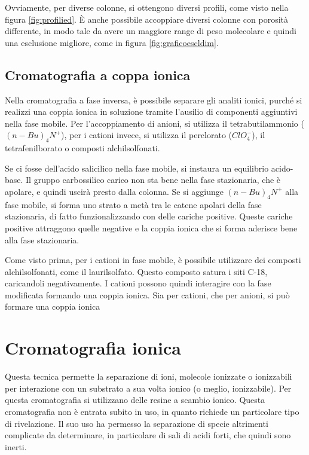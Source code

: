 
Ovviamente, per diverse colonne, si ottengono diversi profili, come visto nella figura \ref{fig:profilied}. È anche possibile accoppiare diversi colonne con porosità differente, in modo tale da avere un maggiore range di peso molecolare e quindi una esclusione migliore, come in figura \ref{fig:graficoescldim}.


\subsection{Cromatografia a coppa ionica}
Nella cromatografia a fase inversa, è possibile separare gli analiti ionici, purché si realizzi una coppia ionica in soluzione tramite l'ausilio di componenti aggiuntivi nella fase mobile. Per l'accoppiamento di anioni, si utilizza il tetrabutilammonio ($(n-Bu)_4N^+$), per i cationi invece, si utilizza il perclorato ($ClO_4^-$), il tetrafenilborato o composti alchilsolfonati.


Se ci fosse dell'acido salicilico nella fase mobile, si instaura un equilibrio acido-base. Il gruppo carbossilico carico non sta bene nella fase stazionaria, che è apolare, e quindi uscirà presto dalla colonna. Se si aggiunge $(n-Bu)_4N^+$ alla fase mobile, si forma uno strato a metà tra le catene apolari della fase stazionaria, di fatto funzionalizzando con delle cariche positive. Queste cariche positive attraggono quelle negative e la coppia ionica che si forma aderisce bene alla fase stazionaria.

Come visto prima, per i cationi in fase mobile, è possibile utilizzare dei composti alchilsolfonati, come il laurilsolfato. Questo composto satura i siti C-18, caricandoli negativamente. I cationi possono quindi interagire con la fase modificata formando una coppia ionica. Sia per cationi, che per anioni, si può formare una coppia ionica

\section{Cromatografia ionica}
Questa tecnica permette la separazione di ioni, molecole ionizzate o ionizzabili per interazione con un substrato a sua volta ionico (o meglio, ionizzabile). Per questa cromatografia si utilizzano delle resine a scambio ionico. Questa cromatografia non è entrata subito in uso, in quanto richiede un particolare tipo di rivelazione. Il suo uso ha permesso la separazione di specie altrimenti complicate da determinare, in particolare di sali di acidi forti, che quindi sono inerti.

